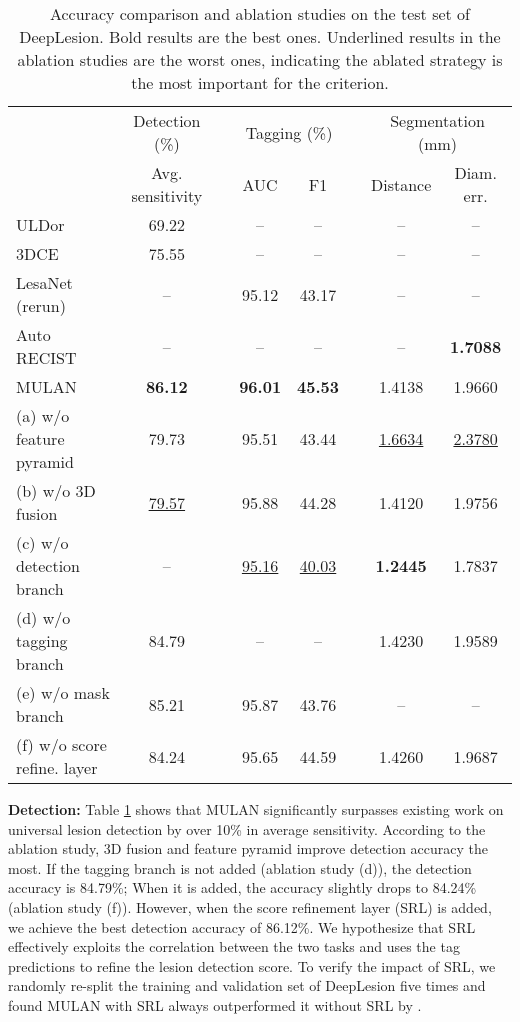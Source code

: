 \documentclass[runningheads]{llncs}
\begin{document}
\begin{table}[]
	\centering
\setlength{\tabcolsep}{2.6pt}
	\renewcommand{\arraystretch}{1.2}
	\caption{Accuracy comparison and ablation studies on the test set of DeepLesion. Bold results are the best ones. Underlined results in the ablation studies are the worst ones, indicating the ablated strategy is the most important for the criterion.}
\begin{tabular}{lccccccc} 

		\hline 
		&	\multicolumn{1}{c}{Detection (\%)} && \multicolumn{2}{c}{Tagging (\%)} && \multicolumn{2}{c}{Segmentation (mm)} \\
		\cline{2-8}
			&	Avg. sensitivity	&&	AUC	&	F1	&& Distance	&	Diam. err.	\\
		\hline
		ULDor \cite{Tang2019Uldor}	& 69.22	&& --	& --	&& --	& -- \\
		3DCE \cite{Yan20183DCE}	& 75.55	&& --	& --	&& --	& -- \\
		LesaNet \cite{Yan2019Lesa} (rerun)	& --	&& 95.12	& 43.17	&& --	& -- \\
		Auto RECIST \cite{Tang2018RECIST} & --	&& --	& --	&& --	& \bf 1.7088 \\
		MULAN	& \bf 86.12	&& \bf 96.01  & \bf 45.53	&& 1.4138 & 1.9660 \\
		\hline
		(a) w/o feature pyramid	& 79.73	&& 95.51  & 43.44	&& \underline{1.6634}	& \underline{2.3780} \\
		(b) w/o 3D fusion	& \underline{79.57}	&& 95.88	& 44.28	&& 1.4120	& 1.9756 \\
		(c) w/o detection branch	& --	&& \underline{95.16}  & \underline{40.03}	&& \bf 1.2445	& 1.7837 \\
		(d) w/o tagging branch	& 84.79	&& --	& --	&& 1.4230	& 1.9589 \\
		(e) w/o mask branch	& 85.21	&& 95.87  & 43.76 && --	& -- \\
		(f) w/o score refine. layer	& 84.24	&& 95.65	& 44.59	&& 1.4260	& 1.9687 \\


		\hline
	\end{tabular}
\label{tbl:res} 
\end{table}



\textbf{Detection:} Table \ref{tbl:res} shows that MULAN significantly surpasses existing work on universal lesion detection by over 10\% in average sensitivity. According to the ablation study, 3D fusion and feature pyramid improve detection accuracy the most. If the tagging branch is not added (ablation study (d)), the detection accuracy is 84.79\%; When it is added, the accuracy slightly drops to 84.24\% (ablation study (f)). However, when the score refinement layer (SRL) is added, we achieve the best detection accuracy of 86.12\%. We hypothesize that SRL effectively exploits the correlation between the two tasks and uses the tag predictions to refine the lesion detection score. To verify the impact of SRL, we randomly re-split the training and validation set of DeepLesion five times and found MULAN with SRL always outperformed it without SRL by .
\end{document}
